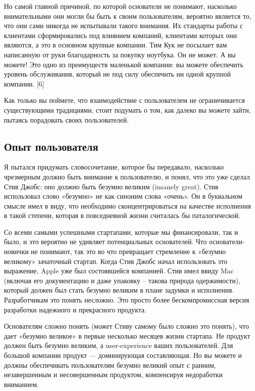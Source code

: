 \documentclass[ebook,12pt,oneside,openany]{memoir}
\begin{document}
Но самой главной причиной, по которой основатели не понимают,
насколько внимательными они могли бы быть к своим пользователям,
вероятно является то, что они сами никогда не испытывали такого
внимания. Их стандарты работы с клиентами сформировались под влиянием
компаний, клиентами которых они являются, а это в основном крупные
компании. Тим Кук не посылает вам написанную от руки благодарность за
покупку ноутбука. Он не может. А вы можете! Это одно из преимуществ
маленькой компании: вы можете обеспечить уровень обслуживания, который
не под силу обеспечить ни одной крупной компании. [6] \newline

Как только вы поймете, что взаимодействие с пользователем не
ограничивается существующими традициями, стоит подумать о том, как
далеко вы можете зайти, пытаясь порадовать своих пользователей. \newline

\subsection{Опыт пользователя}

Я пытался придумать словосочетание, которое бы передавало, насколько
чрезмерным должно быть внимание к пользователю, и понял, что это уже
сделал Стив Джобс: оно должно быть безумно великим (insanely great).
Стив использовал слово «безумно» не как синоним слова «очень». Он в
буквальном смысле имел в виду, что необходимо сконцентрироваться на
качестве исполнения в такой степени, которая в повседневной жизни
считалась бы паталогической. \newline

Со всеми самыми успешными стартапами, которые мы финансировали, так и
было, и это вероятно не удивляет потенциальных основателей. Что
основатели-новички не понимают, так это во что превращает стремление к
«безумно великому» зачаточный стартап. Когда Стив Джобс начал
использовать это выражение, Apple уже был состоявшейся компанией. Стив
имел ввиду Mac (включая его документацию и даже упаковку – такова
природа одержимости), который должен был стать безумно великим в плане
задумки и исполнения. Разработчикам это понять несложно. Это просто
более бескомпромиссная версия разработки надежного и прекрасного
продукта. \newline

Основателям сложно понять (может Стиву самому было сложно это понять),
что дает «безумно великое» в первые несколько месяцев жизни стартапа.
Не продукт должен быть безумно великим, а user-experience ваших
пользователей. Для большой компании продукт — доминирующая
составляющая. Но вы можете и должны обеспечивать пользователям безумно
великий опыт с ранним, незавершенным и несовершенным продуктом,
компенсируя недоработки вниманием. \newline
\end{document}
